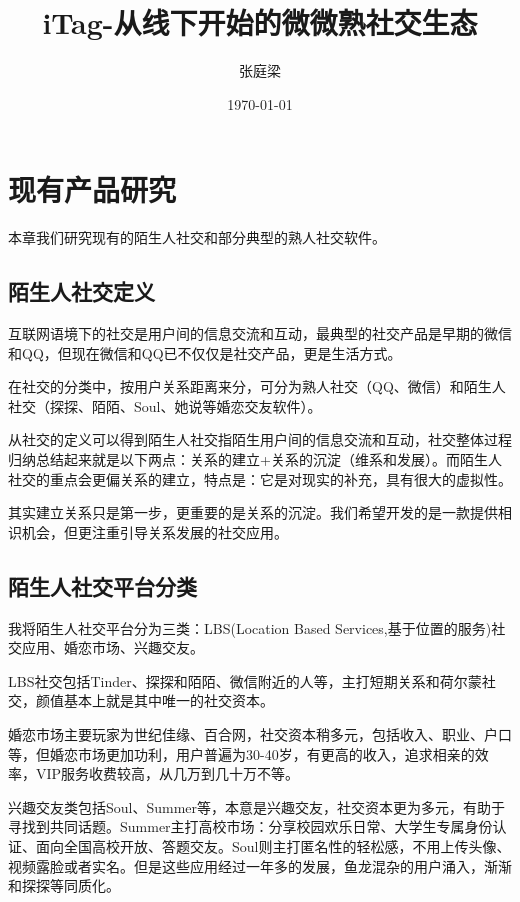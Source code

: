 \documentclass[UTF8]{ctexart}
\title{iTag-从线下开始的微微熟社交生态}
\author{张庭梁}
\date{\today}
\begin{document}
\maketitle

\section{现有产品研究}
本章我们研究现有的陌生人社交和部分典型的熟人社交软件。

\subsection{陌生人社交定义}

\begin{tcolorbox}
    互联网语境下的社交是用户间的信息交流和互动，最典型的社交产品是早期的微信和QQ，但现在微信和QQ已不仅仅是社交产品，更是生活方式。

    在社交的分类中，按用户关系距离来分，可分为熟人社交（QQ、微信）和陌生人社交（探探、陌陌、Soul、她说等婚恋交友软件）。

    从社交的定义可以得到陌生人社交指陌生用户间的信息交流和互动，社交整体过程归纳总结起来就是以下两点：关系的建立+关系的沉淀（维系和发展）。而陌生人社交的重点会更偏关系的建立，特点是：它是对现实的补充，具有很大的虚拟性。\cite{StrangerDefine}
\end{tcolorbox}

其实建立关系只是第一步，更重要的是关系的沉淀。我们希望开发的是一款提供相识机会，但更注重引导关系发展的社交应用。

\subsection{陌生人社交平台分类}
我将陌生人社交平台分为三类：LBS(Location Based Services,基于位置的服务)社交应用、婚恋市场、兴趣交友。

LBS社交包括Tinder、探探和陌陌、微信附近的人等，主打短期关系和荷尔蒙社交，颜值基本上就是其中唯一的社交资本。

婚恋市场主要玩家为世纪佳缘、百合网，社交资本稍多元，包括收入、职业、户口等，但婚恋市场更加功利，用户普遍为30-40岁，有更高的收入，追求相亲的效率，VIP服务收费较高，从几万到几十万不等。

兴趣交友类包括Soul、Summer等，本意是兴趣交友，社交资本更为多元，有助于寻找到共同话题。Summer主打高校市场：分享校园欢乐日常、大学生专属身份认证、面向全国高校开放、答题交友。Soul则主打匿名性的轻松感，不用上传头像、视频露脸或者实名。但是这些应用经过一年多的发展，鱼龙混杂的用户涌入，渐渐和探探等同质化。
\end{document}
